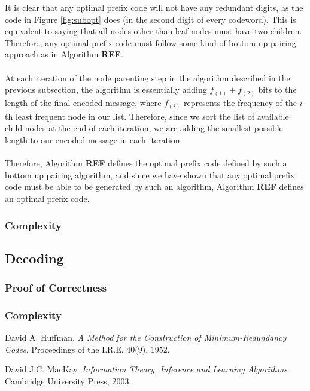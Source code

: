 \documentclass[paper=a4, fontsize=10pt]{article} %
\numberwithin{equation}{section} %
\numberwithin{figure}{section} %
\numberwithin{table}{section} %
\begin{document}
It is clear that any optimal prefix code will not have any redundant digits, as the code in Figure \ref{fig:subopt} does (in the second digit of every codeword). This is equivalent to saying that all nodes other than leaf nodes must have two children. Therefore, any optimal prefix code must follow some kind of bottom-up pairing approach as in Algorithm \textbf{REF}.
\\
\\
At each iteration of the node parenting step in the algorithm described in the previous subsection, the algorithm is essentially adding $f_{(1)} + f_{(2)}$ bits to the length of the final encoded message, where $f_{(i)}$ represents the frequency of the $i$-th least frequent node in our list. Therefore, since we sort the list of available child nodes at the end of each iteration, we are adding the smallest possible length to our encoded message in each iteration.
\\
\\
Therefore, Algorithm \textbf{REF} defines the optimal prefix code defined by such a bottom up pairing algorithm, and since we have shown that any optimal prefix code must be able to be generated by such an algorithm, Algorithm \textbf{REF} defines an optimal prefix code.  

\subsubsection{Complexity}

\subsection{Decoding}

\subsubsection{Proof of Correctness}

\subsubsection{Complexity}




\pagebreak

\begin{thebibliography}{9}
David A. Huffman. 
\textit{A Method for the Construction of Minimum-Redundancy Codes}. 
Proceedings of the I.R.E. 40(9), 1952.
 
David J.C. MacKay. 
\textit{Information Theory, Inference and Learning Algorithms}. 
Cambridge University Press, 2003.
\end{thebibliography}
 
\end{document}
